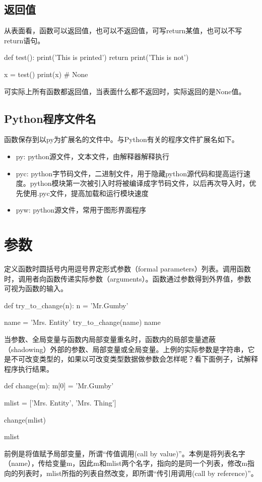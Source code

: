 \subsection{返回值}
从表面看，函数可以返回值，也可以不返回值，可写return某值，也可以不写return语句。
\begin{python}
def test():
    print('This is printed')
    return
    print('This is not')

x = test()
print(x)  # None
\end{python}
可实际上所有函数都返回值，当表面什么都不返回时，实际返回的是None值。
\subsection{Python程序文件名}
函数保存到以py为扩展名的文件中。与Python有关的程序文件扩展名如下。
\begin{itemize}
\item py: python源文件，文本文件，由解释器解释执行
\item pyc: python字节码文件，二进制文件，用于隐藏python源代码和提高运行速度。python模块第一次被引入时将被编译成字节码文件，以后再次导入时，优先使用.pyc文件，提高加载和运行模块速度
\item pyw: python源文件，常用于图形界面程序
\end{itemize}
\section{参数}
定义函数时圆括号内用逗号界定形式参数（formal parameters）列表。调用函数时，调用者向函数传递实际参数（arguments）。函数通过参数得到外界值，参数可视为函数的输入。
\begin{python}
def try_to_change(n):
    n = 'Mr.Gumby'

name = 'Mrs. Entity'
try_to_change(name)
name
\end{python}
当参数、全局变量与函数内局部变量重名时，函数内的局部变量遮蔽（shadowing）外部的参数、局部变量或全局变量。上例的实际参数是字符串，它是不可改变类型的，如果以可改变类型数据做参数会怎样呢？看下面例子，试解释程序执行结果。
\begin{python}
def change(m):
    m[0] = 'Mr.Gumby'

mlist = ['Mrs. Entity', 'Mrs. Thing']

change(mlist)

mlist
\end{python}
前例是将值赋予局部变量，所谓“传值调用(call by value)”。本例是将列表名字（name），传给变量m，因此m和mlist两个名字，指向的是同一个列表，修改m指向的列表时，mlist所指的列表自然改变，即所谓“传引用调用(call by reference)”。
